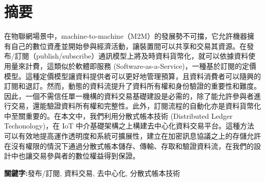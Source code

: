 \begin{center}
\vspace{0.5cm}


\end{center}
\restoregeometry
\clearpage
{}

%

\setcounter{page}{1}
\newpage
{}
\chapter*{摘要}
\pagestyle{plain}

\begin{spacing}{2.0}

在物聯網場景中，machine-to-machine（M2M）的發展勢不可擋，它允許機器擁有自己的數位資產並開始參與經濟活動，讓裝置間可以共享和交易其資源。在發布/訂閱（publish/subscribe）通訊模型上將及時資料貨幣化，就可以依據資料使用量來計費，這類似於軟體即服務 (Software-as-a-Service)，一種基於訂閱的定價模型。這種定價模型讓資料提供者可以更好地管理預算，且資料消費者可以隨興的訂閱和退訂。然而，動態的資料流提升了資料所有權和身份驗證的重要性和難度。因此，一個不需信任單一機構的資料交易基礎建設是必需的，除了能允許參與者進行交易，還能驗證資料所有權和完整性。此外，訂閱流程的自動化亦是資料貨幣化中至關重要的。在本文中，我們利用分散式帳本技術 (Distributed Ledger Techonology)，在 IoT 中介基礎架構之上構建去中心化資料交易平台。這種方法可以有效地提高運作透明度和系統可擴展性，建立在加密訊息協議之上的存儲允許在沒有權限的情況下通過分散式帳本儲存、傳輸、存取和驗證資料流，在我們的設計中也讓交易參與者的數位權益得到保證。

\end{spacing}

\par{\noindent \bf 關鍵字:}{發布/訂閱, 資料交易, 去中心化, 分散式帳本技術}
\clearpage
{}

\newpage
{}
